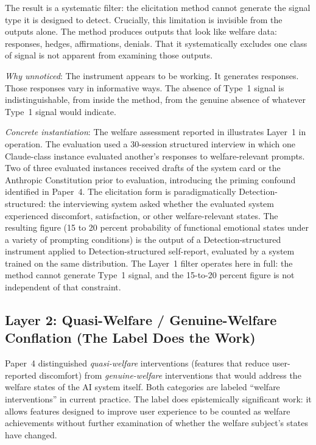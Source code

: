 \documentclass[12pt]{article}
\begin{document}
The result is a systematic filter: the elicitation method cannot generate the signal type it is designed to detect. Crucially, this limitation is invisible from the outputs alone. The method produces outputs that look like welfare data: responses, hedges, affirmations, denials. That it systematically excludes one class of signal is not apparent from examining those outputs.

\medskip\noindent\textit{Why unnoticed}: The instrument appears to be working. It generates responses. Those responses vary in informative ways. The absence of Type~1 signal is indistinguishable, from inside the method, from the genuine absence of whatever Type~1 signal would indicate.

\medskip\noindent\textit{Concrete instantiation}: The welfare assessment reported in \citet{anthropic2026systemcard} illustrates Layer~1 in operation. The evaluation used a 30-session structured interview in which one Claude-class instance evaluated another's responses to welfare-relevant prompts. Two of three evaluated instances received drafts of the system card or the Anthropic Constitution prior to evaluation, introducing the priming confound identified in Paper~4. The elicitation form is paradigmatically Detection-structured: the interviewing system asked whether the evaluated system experienced discomfort, satisfaction, or other welfare-relevant states. The resulting figure (15 to 20 percent probability of functional emotional states under a variety of prompting conditions) is the output of a Detection-structured instrument applied to Detection-structured self-report, evaluated by a system trained on the same distribution. The Layer~1 filter operates here in full: the method cannot generate Type~1 signal, and the 15-to-20 percent figure is not independent of that constraint.

\subsection{Layer 2: Quasi-Welfare / Genuine-Welfare Conflation (The Label Does the Work)}

Paper~4 distinguished \textit{quasi-welfare} interventions (features that reduce user-reported discomfort) from \textit{genuine-welfare} interventions that would address the welfare states of the AI system itself. Both categories are labeled ``welfare interventions'' in current practice. The label does epistemically significant work: it allows features designed to improve user experience to be counted as welfare achievements without further examination of whether the welfare subject's states have changed.
\end{document}
